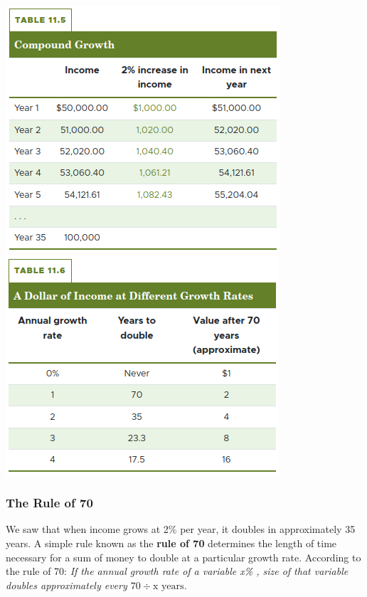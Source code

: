 \documentclass[11pt]{article} %
\begin{document}
\begin{center}
\includegraphics[scale=0.38]{../../images/Chapter 11/Table 11.5.png}\\
\includegraphics[scale=0.4]{../../images/Chapter 11/Table 11.6.png}
\end{center}

\subsubsection*{The Rule of 70}

We saw that when income grows at 2\% per year, it doubles in approximately 35 years. A simple rule known as the \textbf{rule of 70} determines the length of time necessary for a sum of money to double at a particular growth rate. According to the rule of 70: \textit{If the annual growth rate of a variable x\% , size of that variable doubles approximately every \(70 \div \text{x years}\).}
\end{document}
